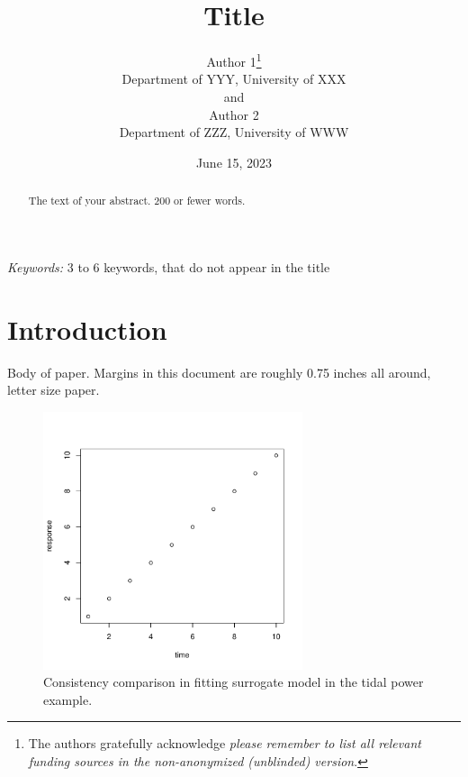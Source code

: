 \documentclass[
  12pt]{article}
\begin{document}
\def\spacingset#1{\renewcommand{\baselinestretch}%
{#1}\small\normalsize} \spacingset{1}



\date{June 15, 2023}
\title{\bf Title}
\author{
Author 1\thanks{The authors gratefully acknowledge \emph{please remember
to list all relevant funding sources in the non-anonymized (unblinded)
version}.}\\
Department of YYY, University of XXX\\
and\\Author 2\\
Department of ZZZ, University of WWW\\
}
\maketitle

\bigskip
\bigskip
\begin{abstract}
The text of your abstract. 200 or fewer words.
\end{abstract}

\noindent%
{\it Keywords:} 3 to 6 keywords, that do not appear in the title
\vfill

\newpage
\spacingset{1.9} %
\ifdefined\Shaded\renewenvironment{Shaded}{\begin{tcolorbox}[breakable, sharp corners, borderline west={3pt}{0pt}{shadecolor}, enhanced, interior hidden, boxrule=0pt, frame hidden]}{\end{tcolorbox}}\fi

\hypertarget{sec-intro}{%
\section{Introduction}\label{sec-intro}}

Body of paper. Margins in this document are roughly 0.75 inches all
around, letter size paper.

\begin{figure}

{\centering \includegraphics[width=3in,height=\textheight]{fig1.pdf}

}

\caption{\label{fig-first}Consistency comparison in fitting surrogate
model in the tidal power example.}

\end{figure}
\end{document}
